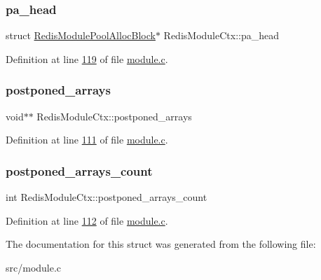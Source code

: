 \mbox{\label{structRedisModuleCtx_a78b05b9ed907cffc49e06a6b2bd33c64}} 
\subsubsection{\texorpdfstring{pa\+\_\+head}{pa\_head}}
{\footnotesize\ttfamily struct \hyperlink{structRedisModulePoolAllocBlock}{Redis\+Module\+Pool\+Alloc\+Block}$\ast$ Redis\+Module\+Ctx\+::pa\+\_\+head}



Definition at line \hyperlink{module_8c_source_l00119}{119} of file \hyperlink{module_8c_source}{module.\+c}.

\mbox{\label{structRedisModuleCtx_a43751d993bfe496f87440891e8f5208f}} 
\subsubsection{\texorpdfstring{postponed\+\_\+arrays}{postponed\_arrays}}
{\footnotesize\ttfamily void$\ast$$\ast$ Redis\+Module\+Ctx\+::postponed\+\_\+arrays}



Definition at line \hyperlink{module_8c_source_l00111}{111} of file \hyperlink{module_8c_source}{module.\+c}.

\mbox{\label{structRedisModuleCtx_a471a8b2f1332e52ac8696576bef723bb}} 
\subsubsection{\texorpdfstring{postponed\+\_\+arrays\+\_\+count}{postponed\_arrays\_count}}
{\footnotesize\ttfamily int Redis\+Module\+Ctx\+::postponed\+\_\+arrays\+\_\+count}



Definition at line \hyperlink{module_8c_source_l00112}{112} of file \hyperlink{module_8c_source}{module.\+c}.



The documentation for this struct was generated from the following file\+:\begin{DoxyCompactItemize}
\item 
src/module.\+c\end{DoxyCompactItemize}
